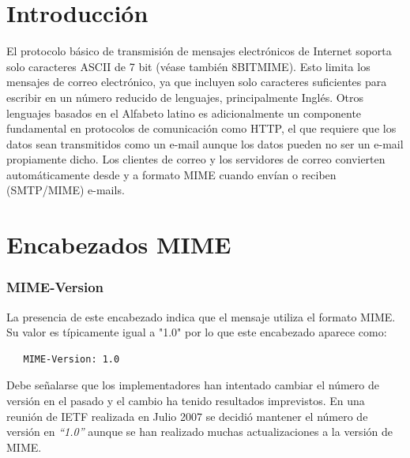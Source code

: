 \documentclass[a4paper]{report}
\begin{document}
\section{Introducción}
El protocolo básico de transmisión de mensajes electrónicos de Internet soporta
solo caracteres ASCII de 7 bit (véase también 8BITMIME). Esto limita los
mensajes de correo electrónico, ya que incluyen solo caracteres suficientes para
escribir en un número reducido de lenguajes, principalmente Inglés. Otros
lenguajes basados en el Alfabeto latino es adicionalmente un componente
fundamental en protocolos de comunicación como HTTP, el que requiere que los
datos sean transmitidos como un e-mail aunque los datos pueden no ser un e-mail
propiamente dicho. Los clientes de correo y los servidores de correo convierten
automáticamente desde y a formato MIME cuando envían o reciben (SMTP/MIME)
e-mails.

\section*{Encabezados MIME}
\subsubsection*{MIME-Version}
La presencia de este encabezado indica que el mensaje utiliza el formato MIME. Su valor es típicamente igual a "1.0" por lo que este encabezado aparece como:

\begin{verbatim}
   MIME-Version: 1.0
\end{verbatim}

Debe señalarse que los implementadores han intentado cambiar el número de
versión en el pasado y el cambio ha tenido resultados imprevistos. En una
reunión de IETF realizada en Julio 2007 se decidió mantener el número de versión
en \emph{``1.0''} aunque se han realizado muchas actualizaciones a la versión de MIME.
\end{document}
